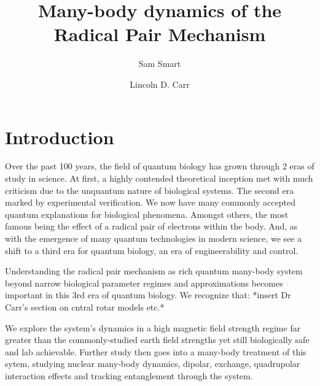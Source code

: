 \documentclass[12pt]{article}
\title{Many-body dynamics of the Radical Pair Mechanism}
\author{Sam Smart \and Lincoln D. Carr}
\date{}
\begin{document}
\maketitle

\section{Introduction}
Over the past 100 years, the field of quantum biology has grown through 2 eras of study in science. At first, a highly contended theoretical inception met with much criticism due to the unquantum nature of biological systems. 
The second era marked by experimental verification. We now have many commonly accepted quantum explanations for biological phenomena. Amongst others, the most famous being the effect of a radical pair of electrons within the body. 
And, as with the emergence of many quantum technologies in modern science, we see a shift to a third era for quantum biology, an era of engineerability and control. 

Understanding the radical pair mechanism as rich quantum many-body system beyond narrow biological parameter regimes and approximations becomes important in this 3rd era of quantum biology. We recognize that: *insert Dr Carr's section on cntral rotar models etc.*

We explore the system's dynamics in a high magnetic field strength regime far greater than the commonly-studied earth field strengths yet still biologically safe and lab achievable. 
Further study then goes into a many-body treatment of this sytem, studying nuclear many-body dynamics, dipolar, exchange, quadrupolar interaction effects and tracking entanglement through the system.
\end{document}
